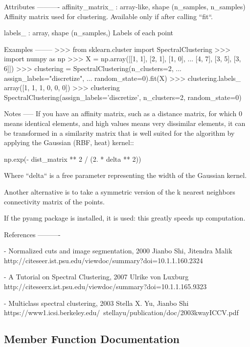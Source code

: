 \begin{DoxyVerb}
Attributes
----------
affinity_matrix_ : array-like, shape (n_samples, n_samples)
    Affinity matrix used for clustering. Available only if after calling
    ``fit``.

labels_ : array, shape (n_samples,)
    Labels of each point

Examples
--------
>>> from sklearn.cluster import SpectralClustering
>>> import numpy as np
>>> X = np.array([[1, 1], [2, 1], [1, 0],
...               [4, 7], [3, 5], [3, 6]])
>>> clustering = SpectralClustering(n_clusters=2,
...         assign_labels="discretize",
...         random_state=0).fit(X)
>>> clustering.labels_
array([1, 1, 1, 0, 0, 0])
>>> clustering
SpectralClustering(assign_labels='discretize', n_clusters=2,
    random_state=0)

Notes
-----
If you have an affinity matrix, such as a distance matrix,
for which 0 means identical elements, and high values means
very dissimilar elements, it can be transformed in a
similarity matrix that is well suited for the algorithm by
applying the Gaussian (RBF, heat) kernel::

    np.exp(- dist_matrix ** 2 / (2. * delta ** 2))

Where ``delta`` is a free parameter representing the width of the Gaussian
kernel.

Another alternative is to take a symmetric version of the k
nearest neighbors connectivity matrix of the points.

If the pyamg package is installed, it is used: this greatly
speeds up computation.

References
----------

- Normalized cuts and image segmentation, 2000
  Jianbo Shi, Jitendra Malik
  http://citeseer.ist.psu.edu/viewdoc/summary?doi=10.1.1.160.2324

- A Tutorial on Spectral Clustering, 2007
  Ulrike von Luxburg
  http://citeseerx.ist.psu.edu/viewdoc/summary?doi=10.1.1.165.9323

- Multiclass spectral clustering, 2003
  Stella X. Yu, Jianbo Shi
  https://www1.icsi.berkeley.edu/~stellayu/publication/doc/2003kwayICCV.pdf
\end{DoxyVerb}
 

\subsection{Member Function Documentation}
\mbox{\label{classdsmacc_1_1examples_1_1__spectral_1_1SpectralClustering_a5af13c6812bd105744f4682a0f084511}} 
